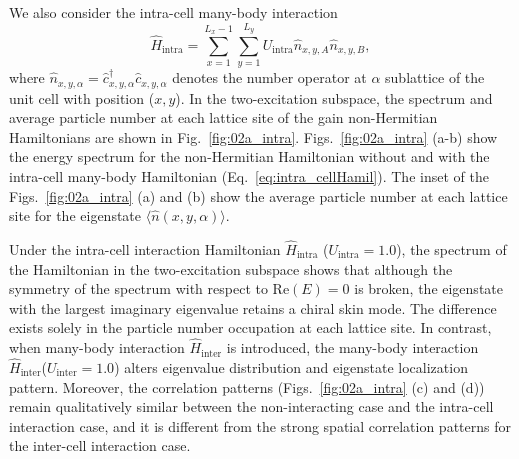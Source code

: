 \documentclass[longbibliography, aps, prx, amsmath, amssymb, amsfonts, twocolumn,superscriptaddress, footinbib]{revtex4-1}
\begin{document}
    We also consider the intra-cell many-body interaction
    \begin{equation}
        \hat{H}_{\text{intra}} = \sum_{{x}=1}^{L_{x}-1} \sum_{{y}=1}^{L_{y}}  U_{\text{intra}} \hat{n}_{{x}, {y}, A} \hat{n}_{{x}, {y}, B}, \label{eq:intra_cellHamil}
    \end{equation}
    where $\hat{n}_{{x},{y},\alpha}=\hat{c}_{x,y,\alpha}^{\dagger}\hat{c}_{x,y,\alpha}$ denotes the number operator at $\alpha$ sublattice of the unit cell with position (${x},{y}$).
    In the two-excitation subspace, the spectrum and average particle number at each lattice site of the gain non-Hermitian Hamiltonians 
	are shown in Fig.~\ref{fig:02a_intra}. Figs.~\ref{fig:02a_intra} (a-b) show the energy spectrum for the non-Hermitian Hamiltonian without and with the intra-cell many-body Hamiltonian (Eq.~\ref{eq:intra_cellHamil}). 
    The inset of the Figs.~\ref{fig:02a_intra} (a) and (b) show the average particle number at each lattice site for the eigenstate $\langle \hat{n}(x,y,\alpha) \rangle$.

   Under the intra-cell interaction Hamiltonian $\hat{H}_{\text{intra}}$ ($U_{\text{intra}}=1.0$), the spectrum of the Hamiltonian in the two-excitation subspace shows that although the symmetry of the spectrum with respect to $\mathrm{Re}(E)=0$ is broken, the eigenstate with the largest imaginary eigenvalue retains a chiral skin mode. 
	The difference exists solely in the particle number occupation at each lattice site. In contrast, when many-body interaction $\hat{H}_{\text{inter}}$ is introduced, the many-body interaction $\hat{H}_{\text{inter}}$($U_{\text{inter}}=1.0$) alters eigenvalue distribution and eigenstate localization pattern. Moreover,
    the correlation patterns (Figs.~\ref{fig:02a_intra} (c) and (d)) remain qualitatively similar between the non-interacting case and the intra-cell interaction case, and it is different from the strong spatial correlation patterns for the inter-cell interaction case. 
\end{document}
